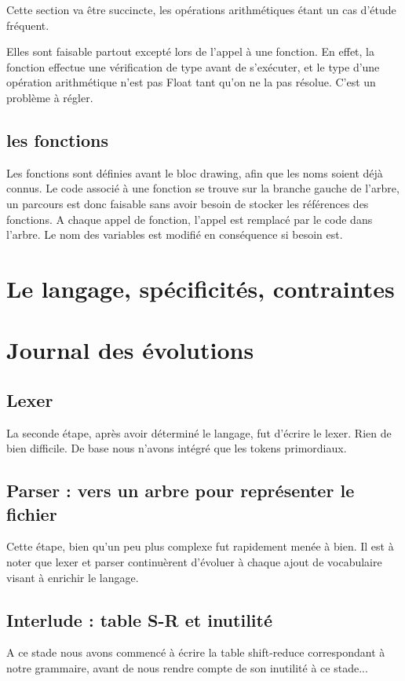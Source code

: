 \documentclass[11pt]{report} %
\begin{document}
Cette section va être succincte, les opérations arithmétiques étant un cas d'étude fréquent. 

Elles sont faisable partout excepté lors de l'appel à une fonction. En effet, la fonction effectue une vérification de type avant de s'exécuter, et le type d'une opération arithmétique n'est pas Float tant qu'on ne la pas résolue. C'est un problème à régler.

\section{les fonctions}

Les fonctions sont définies avant le bloc drawing, afin que les noms soient déjà connus. Le code associé à une fonction se trouve sur la branche gauche de l'arbre, un parcours est donc faisable sans avoir besoin de stocker les références des fonctions. A chaque appel de fonction, l'appel est remplacé par le code dans l'arbre. Le nom des variables est modifié en conséquence si besoin est.


\chapter{Le langage, spécificités, contraintes} %

\appendix

\chapter{Journal des évolutions}
\section{Lexer}
La seconde étape, après avoir déterminé le langage, fut d'écrire le lexer. Rien de bien difficile. De base nous n'avons intégré que les tokens primordiaux.
\section{Parser : vers un arbre pour représenter le fichier}
Cette étape, bien qu'un peu plus complexe fut rapidement menée à bien. Il est à noter que lexer et parser continuèrent d'évoluer à chaque ajout de vocabulaire visant à enrichir le langage.
\section{Interlude : table S-R et inutilité}
A ce stade nous avons commencé à écrire la table shift-reduce correspondant à notre grammaire, avant de nous rendre compte de son inutilité à ce stade...
\end{document}
